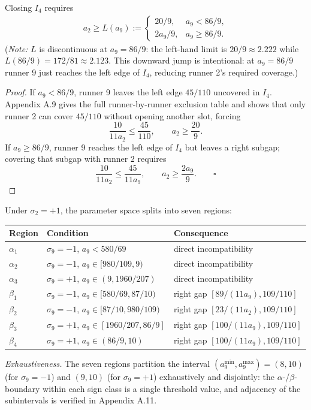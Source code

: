 \documentclass[12pt]{article}
\begin{document}
\begin{lemma}\label{l:63}
Closing $I_4$ requires
\begin{align*}
a_2 \ge L(a_9) :=
  \begin{cases}
    20/9, & a_9 < 86/9,\\[2pt]
    2a_9/9, & a_9 \ge 86/9.
  \end{cases}
\end{align*}
(\emph{Note:} $L$ is discontinuous at $a_9=86/9$: the left-hand limit is $20/9\approx 2.222$
while $L(86/9)=172/81\approx 2.123$. This downward jump is intentional: at $a_9=86/9$
runner 9 just reaches the left edge of $I_4$, reducing runner 2's required coverage.)

\end{lemma}
\begin{proof}
If $a_9<86/9$, runner 9 leaves the left edge $45/110$ uncovered in $I_4$.
Appendix A.9 gives the full runner-by-runner exclusion table and shows that only runner 2
can cover $45/110$ without opening another slot, forcing
\[
\frac{10}{11a_2} \le \frac{45}{110},\qquad a_2 \ge \frac{20}{9}.
\]
If $a_9\ge 86/9$, runner 9 reaches the left edge of $I_4$ but leaves a right subgap;
covering that subgap with runner 2 requires
\[
\frac{10}{11a_2} \le \frac{45}{11a_9},\qquad a_2 \ge \frac{2a_9}{9}.\qquad\square
\]

\end{proof}
\begin{lemma}\label{l:64}
Under $\sigma_2=+1$, the parameter space splits
into seven regions:

\begin{center}
\begin{tabular}{@{}lll@{}}
\toprule
Region & Condition & Consequence \\
\midrule
$\alpha_1$ & $\sigma_9=-1$, $a_9<580/69$ & direct incompatibility \\
$\alpha_2$ & $\sigma_9=-1$, $a_9\in[980/109,9)$ & direct incompatibility \\
$\alpha_3$ & $\sigma_9=+1$, $a_9\in(9,1960/207)$ & direct incompatibility \\
$\beta_1$ & $\sigma_9=-1$, $a_9\in[580/69,87/10)$ & right gap $[89/(11a_9),109/110]$ \\
$\beta_2$ & $\sigma_9=-1$, $a_9\in[87/10,980/109)$ & right gap $[23/(11a_2),109/110]$ \\
$\beta_3$ & $\sigma_9=+1$, $a_9\in[1960/207,86/9]$ & right gap $[100/(11a_9),109/110]$ \\
$\beta_4$ & $\sigma_9=+1$, $a_9\in(86/9,10)$ & right gap $[100/(11a_9),109/110]$ \\
\bottomrule
\end{tabular}
\end{center}

\emph{Exhaustiveness.} The seven regions partition the interval
$(a_9^{\min},a_9^{\max})=(8,10)$ (for $\sigma_9=-1$) and $(9,10)$ (for $\sigma_9=+1$)
exhaustively and disjointly: the $\alpha$-/$\beta$-boundary within each sign class is a
single threshold value, and adjacency of the subintervals is verified in Appendix A.11.

\end{lemma}
\end{document}
